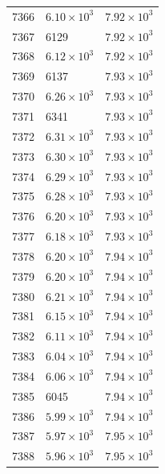 \begin{table}[H]
\begin{tabular}{lll}
7366 & $\displaystyle 6.10 \times 10^{3}$ & $\displaystyle 7.92 \times 10^{3}$ \\
7367 & 6129 & $\displaystyle 7.92 \times 10^{3}$ \\
7368 & $\displaystyle 6.12 \times 10^{3}$ & $\displaystyle 7.92 \times 10^{3}$ \\
7369 & 6137 & $\displaystyle 7.93 \times 10^{3}$ \\
7370 & $\displaystyle 6.26 \times 10^{3}$ & $\displaystyle 7.93 \times 10^{3}$ \\
7371 & 6341 & $\displaystyle 7.93 \times 10^{3}$ \\
7372 & $\displaystyle 6.31 \times 10^{3}$ & $\displaystyle 7.93 \times 10^{3}$ \\
7373 & $\displaystyle 6.30 \times 10^{3}$ & $\displaystyle 7.93 \times 10^{3}$ \\
7374 & $\displaystyle 6.29 \times 10^{3}$ & $\displaystyle 7.93 \times 10^{3}$ \\
7375 & $\displaystyle 6.28 \times 10^{3}$ & $\displaystyle 7.93 \times 10^{3}$ \\
7376 & $\displaystyle 6.20 \times 10^{3}$ & $\displaystyle 7.93 \times 10^{3}$ \\
7377 & $\displaystyle 6.18 \times 10^{3}$ & $\displaystyle 7.93 \times 10^{3}$ \\
7378 & $\displaystyle 6.20 \times 10^{3}$ & $\displaystyle 7.94 \times 10^{3}$ \\
7379 & $\displaystyle 6.20 \times 10^{3}$ & $\displaystyle 7.94 \times 10^{3}$ \\
7380 & $\displaystyle 6.21 \times 10^{3}$ & $\displaystyle 7.94 \times 10^{3}$ \\
7381 & $\displaystyle 6.15 \times 10^{3}$ & $\displaystyle 7.94 \times 10^{3}$ \\
7382 & $\displaystyle 6.11 \times 10^{3}$ & $\displaystyle 7.94 \times 10^{3}$ \\
7383 & $\displaystyle 6.04 \times 10^{3}$ & $\displaystyle 7.94 \times 10^{3}$ \\
7384 & $\displaystyle 6.06 \times 10^{3}$ & $\displaystyle 7.94 \times 10^{3}$ \\
7385 & 6045 & $\displaystyle 7.94 \times 10^{3}$ \\
7386 & $\displaystyle 5.99 \times 10^{3}$ & $\displaystyle 7.94 \times 10^{3}$ \\
7387 & $\displaystyle 5.97 \times 10^{3}$ & $\displaystyle 7.95 \times 10^{3}$ \\
7388 & $\displaystyle 5.96 \times 10^{3}$ & $\displaystyle 7.95 \times 10^{3}$ \\

\end{tabular}
\end{table}
